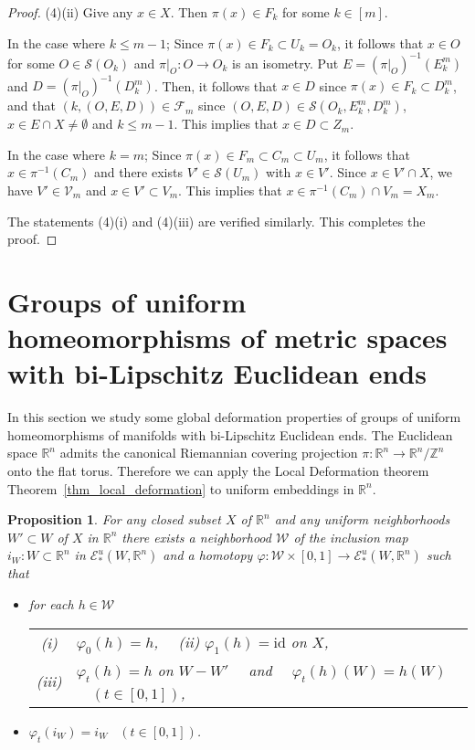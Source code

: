 \documentclass[11pt, fleqn]{amsart}
\newtheorem{proposition}{Proposition}[section]
\theoremstyle{definition}
\newcommand{\cal}{\mathcal}
\renewcommand{\phi}{\varphi}
\newcommand{\lra}{\longrightarrow}
\newcommand{\id}{\mathrm{id}}
\newcommand{\E}{\mathcal E}
\newcommand{\W}{\mathcal W}
\newcommand{\IR}{\mathbb R}
\newcommand{\IZ}{\mathbb Z}
\begin{document}
\begin{proof}
(4)(ii) Give any $x \in X$. Then $\pi(x) \in F_k$ for some $k \in [m]$. 

In the case where $k \leq m - 1$; 
Since $\pi(x) \in F_k \subset U_k = O_k$, it follows that 
$x \in O$ for some $O \in {\cal S}(O_k)$ and $\pi|_O : O \to O_k$ is an isometry.
Put $E = (\pi|_O)^{-1}(E_k^m)$ and $D = (\pi|_O)^{-1}(D_k^m)$. 
Then, it follows that $x \in D$ since $\pi(x) \in F_k \subset D_k^m$, and that 
$(k, (O, E, D)) \in {\cal F}_m$ since $(O, E, D) \in {\cal S}(O_k, E_k^m, D_k^m)$, $x \in E \cap X \neq \emptyset$ and $k \leq m-1$. 
This implies that $x \in D \subset Z_m$. 

In the case where $k = m$; 
Since $\pi(x) \in F_m \subset C_m \subset U_m$, 
it follows that $x \in \pi^{-1}(C_m)$ and there exists $V' \in {\cal S}(U_m)$ with $x \in V'$. 
Since $x \in V' \cap X$, we have $V' \in {\cal V}_m$ and $x \in V' \subset V_m$. 
This implies that $x \in \pi^{-1}(C_m) \cap V_m = X_m$.  

The statements (4)(i) and (4)(iii) are verified similarly. This completes the proof. 
\end{proof} 

\section{Groups of uniform homeomorphisms of metric spaces with bi-Lipschitz Euclidean ends} 

In this section we study some global deformation properties of groups of uniform homeomorphisms of manifolds with bi-Lipschitz Euclidean ends. 
The Euclidean space $\IR^n$ admits the canonical Riemannian covering projection $\pi : \IR^n \to \IR^n/\IZ^n$ onto the flat torus. 
Therefore we can apply the Local Deformation theorem Theorem~\ref{thm_local_deformation} to uniform embeddings in $\IR^n$. 

\begin{proposition}\label{prop_deform_Euclid} 
For any closed subset $X$ of $\IR^n$ and any uniform neighborhoods $W' \subset W$ of $X$ in $\IR^n$ 
there exists a neighborhood $\W$ of the inclusion map $i_W : W \subset \IR^n$ in $\E^u_\ast(W, \IR^n)$ and 
a homotopy $\phi : \W \times [0,1] \lra \E^u_\ast(W, \IR^n)$ such that 
\begin{itemize} 
\item[(1)] for each $h \in \W$ \ \ 
\begin{tabular}[t]{c@{\ }l}
{\rm (i)} & $\phi_0(h) = h$, \ \ 
{\rm (ii)} $\phi_1(h) = \id$ on $X$, \\[2mm] 
{\rm (iii)} & $\phi_t(h) = h$ on $W - W'$ \ \ and \ \ $\phi_t(h)(W) = h(W)$ \ \ $(t \in [0,1])$,  
\end{tabular}
\vskip 1mm 
\item[(2)] $\phi_t(i_W) = i_W$ \ $(t \in [0,1])$.
\end{itemize} 
\end{proposition} 
\end{document}
